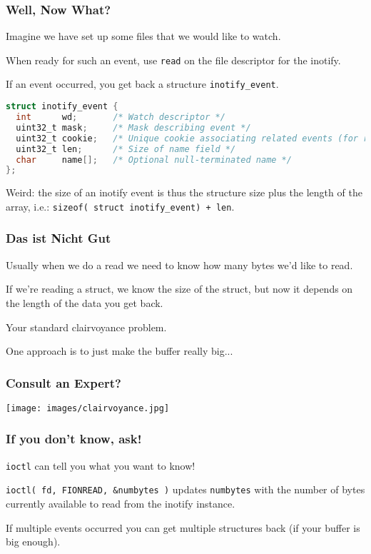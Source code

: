 \begin{frame}[fragile]
	\frametitle{Well, Now What?}

	Imagine we have set up some files that we would like to watch.

	When ready for such an event, use \texttt{read} on the file descriptor for the inotify.

	If an event occurred, you get back a structure \texttt{inotify\_event}.

	\begin{lstlisting}[language=C]
struct inotify_event {
  int      wd;       /* Watch descriptor */
  uint32_t mask;     /* Mask describing event */
  uint32_t cookie;   /* Unique cookie associating related events (for rename(2))*/  
  uint32_t len;      /* Size of name field */
  char     name[];   /* Optional null-terminated name */
};
\end{lstlisting}

	Weird: the size of an inotify event is thus the structure size plus the length of the array, i.e.: \texttt{sizeof( struct inotify\_event) + len}.

\end{frame}


\begin{frame}
	\frametitle{Das ist Nicht Gut}

	Usually when we do a read we need to know how many bytes we'd like to read.

	If we're reading a struct, we know the size of the struct, but now it depends on the length of the data you get back.

	Your standard clairvoyance problem.

	One approach is to just make the buffer really big...

\end{frame}


\begin{frame}
	\frametitle{Consult an Expert?}

	\begin{center}
		\texttt{[image: images/clairvoyance.jpg]}
	\end{center}

\end{frame}



\begin{frame}
	\frametitle{If you don't know, ask!}

	\texttt{ioctl} can tell you what you want to know!

	\texttt{ioctl( fd, FIONREAD, \&numbytes )} updates \texttt{numbytes} with the number of bytes currently available to read from the inotify instance.

	If multiple events occurred you can get multiple structures back (if your buffer is big enough).


\end{frame}

